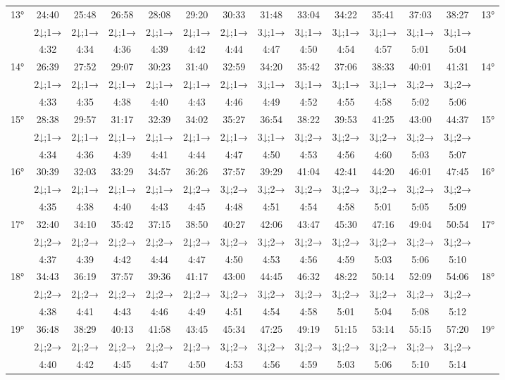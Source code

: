 \begin{scriptsize}
\begin{tabular}{c || c | c | c | c | c | c | c | c | c | c | c | c || c}
		\multirow{3}{*}{13°}&24:40&25:48&26:58&28:08&29:20&30:33&31:48&33:04&34:22&35:41&37:03&38:27&\multirow{3}{*}{13°}\\ \space&2↓;1→&2↓;1→&2↓;1→&2↓;1→&2↓;1→&2↓;1→&3↓;1→&3↓;1→&3↓;1→&3↓;1→&3↓;1→&3↓;1→&\space\\&4:32&4:34&4:36&4:39&4:42&4:44&4:47&4:50&4:54&4:57&5:01&5:04&\space\\\hline
		\multirow{3}{*}{14°}&26:39&27:52&29:07&30:23&31:40&32:59&34:20&35:42&37:06&38:33&40:01&41:31&\multirow{3}{*}{14°}\\ \space&2↓;1→&2↓;1→&2↓;1→&2↓;1→&2↓;1→&2↓;1→&3↓;1→&3↓;1→&3↓;1→&3↓;1→&3↓;2→&3↓;2→&\space\\&4:33&4:35&4:38&4:40&4:43&4:46&4:49&4:52&4:55&4:58&5:02&5:06&\space\\\hline
		\multirow{3}{*}{15°}&28:38&29:57&31:17&32:39&34:02&35:27&36:54&38:22&39:53&41:25&43:00&44:37&\multirow{3}{*}{15°}\\ \space&2↓;1→&2↓;1→&2↓;1→&2↓;1→&2↓;1→&2↓;1→&3↓;1→&3↓;2→&3↓;2→&3↓;2→&3↓;2→&3↓;2→&\space\\&4:34&4:36&4:39&4:41&4:44&4:47&4:50&4:53&4:56&4:60&5:03&5:07&\space\\\hline
		\multirow{3}{*}{16°}&30:39&32:03&33:29&34:57&36:26&37:57&39:29&41:04&42:41&44:20&46:01&47:45&\multirow{3}{*}{16°}\\ \space&2↓;1→&2↓;1→&2↓;1→&2↓;1→&2↓;2→&3↓;2→&3↓;2→&3↓;2→&3↓;2→&3↓;2→&3↓;2→&3↓;2→&\space\\&4:35&4:38&4:40&4:43&4:45&4:48&4:51&4:54&4:58&5:01&5:05&5:09&\space\\\hline
		\multirow{3}{*}{17°}&32:40&34:10&35:42&37:15&38:50&40:27&42:06&43:47&45:30&47:16&49:04&50:54&\multirow{3}{*}{17°}\\ \space&2↓;2→&2↓;2→&2↓;2→&2↓;2→&2↓;2→&3↓;2→&3↓;2→&3↓;2→&3↓;2→&3↓;2→&3↓;2→&3↓;2→&\space\\&4:37&4:39&4:42&4:44&4:47&4:50&4:53&4:56&4:59&5:03&5:06&5:10&\space\\\hline
		\multirow{3}{*}{18°}&34:43&36:19&37:57&39:36&41:17&43:00&44:45&46:32&48:22&50:14&52:09&54:06&\multirow{3}{*}{18°}\\ \space&2↓;2→&2↓;2→&2↓;2→&2↓;2→&2↓;2→&3↓;2→&3↓;2→&3↓;2→&3↓;2→&3↓;2→&3↓;2→&3↓;2→&\space\\&4:38&4:41&4:43&4:46&4:49&4:51&4:54&4:58&5:01&5:04&5:08&5:12&\space\\\hline
		\multirow{3}{*}{19°}&36:48&38:29&40:13&41:58&43:45&45:34&47:25&49:19&51:15&53:14&55:15&57:20&\multirow{3}{*}{19°}\\ \space&2↓;2→&2↓;2→&2↓;2→&2↓;2→&2↓;2→&3↓;2→&3↓;2→&3↓;2→&3↓;2→&3↓;2→&3↓;2→&3↓;2→&\space\\&4:40&4:42&4:45&4:47&4:50&4:53&4:56&4:59&5:03&5:06&5:10&5:14&\space\\\hline

\end{tabular}
\end{scriptsize}
